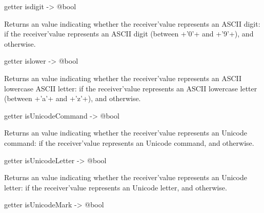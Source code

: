 
\begin{galgascode}
getter isdigit -> @bool
\end{galgascode}

Returns an  value indicating whether the receiver'value represents an ASCII digit:  if the receiver'value represents an ASCII digit (between \ggs+'0'+ and \ggs+'9'+), and  otherwise.






\begin{galgascode}
getter islower -> @bool
\end{galgascode}

Returns an  value indicating whether the receiver'value represents an ASCII lowercase ASCII letter:  if the receiver'value represents an ASCII lowercase letter (between \ggs+'a'+ and \ggs+'z'+), and  otherwise.







\begin{galgascode}
getter isUnicodeCommand -> @bool
\end{galgascode}

Returns an  value indicating whether the receiver'value represents an Unicode command:  if the receiver'value represents an Unicode command, and  otherwise.







\begin{galgascode}
getter isUnicodeLetter -> @bool
\end{galgascode}

Returns an  value indicating whether the receiver'value represents an Unicode letter:  if the receiver'value represents an Unicode letter, and  otherwise.







\begin{galgascode}
getter isUnicodeMark -> @bool
\end{galgascode}

